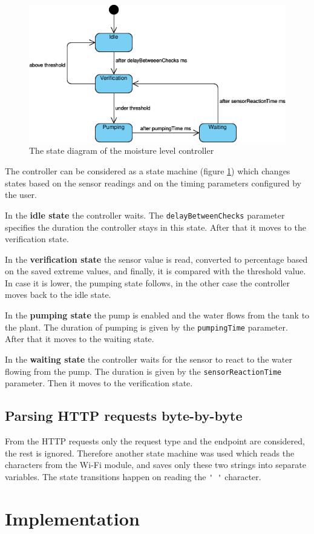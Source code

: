 \begin{figure}[ht]
    \centering
    \includegraphics[width=\linewidth]{img/Irrigation station controller state diagram.png}
    \caption{The state diagram of the moisture level controller}
    \label{fig:controller_state_diagram}
\end{figure}

The controller can be considered as a state machine (figure \ref{fig:controller_state_diagram})  which changes states based on the sensor readings and on the timing parameters configured by the user.

In the \textbf{idle state} the controller waits. The \verb|delayBetweenChecks| parameter specifies the duration the controller stays in this state. After that it moves to the verification state.

In the \textbf{verification state} the sensor value is read, converted to percentage based on the saved extreme values, and  finally, it is compared with the threshold value. In case it is lower, the pumping state follows, in the other case the controller moves back to the idle state.

In the \textbf{pumping state} the pump is enabled and the water flows from the tank to the plant. The duration of pumping is given by the \verb|pumpingTime| parameter. After that it moves to the waiting state.

In the \textbf{waiting state} the controller waits for the sensor to react to the water flowing from the pump. The duration is given by the \verb|sensorReactionTime| parameter. Then it moves to the verification state.

\subsection{Parsing HTTP requests byte-by-byte}
\label{sec:http_fsm}

From the HTTP requests only the request type and the endpoint are considered, the rest is ignored. Therefore another state machine was used which reads the characters from the Wi-Fi module, and saves only these two strings into separate variables. The state transitions happen on reading the \verb|' '| character.





\section{Implementation}



